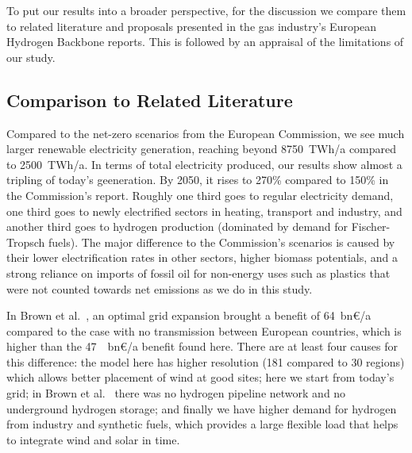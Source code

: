 To put our results into a broader perspective, for the discussion we compare
them to related literature and proposals presented in the gas industry's
European Hydrogen Backbone reports. This is followed by an appraisal of the
limitations of our study.

\subsection*{Comparison to Related Literature}

Compared to the net-zero scenarios from the European
Commission\cite{in-depth_2018}, we see much larger renewable electricity
generation, reaching beyond 8750~TWh/a compared to 2500~TWh/a.\cite{in-depth_2018} In terms of total electricity produced, our results show
almost a tripling of today's geeneration. By 2050, it rises to 270\% compared to 150\%
in the Commission's report.\cite{in-depth_2018} Roughly one third goes to regular
electricity demand, one third goes to newly electrified sectors in heating,
transport and industry, and another third goes to hydrogen production (dominated by
demand for Fischer-Tropsch fuels). The major difference to the Commission's
scenarios\cite{in-depth_2018} is caused by their lower electrification rates in
other sectors, higher biomass potentials, and a strong reliance on imports of
fossil oil for non-energy uses such as plastics that were not counted towards
net emissions as we do in this study.

In Brown et al.~\cite{brownSynergiesSector2018}, an optimal grid expansion
brought a benefit of 64~bn\euro/a compared to the case with no
transmission between European countries, which is higher than the
47~~bn\euro/a benefit found here. There are at least four causes for
this difference: the model here has higher resolution (181 compared to 30
regions) which allows better placement of wind at good sites; here we start from
today's grid; in Brown et al.~\cite{brownSynergiesSector2018} there was no
hydrogen pipeline network and no underground hydrogen storage; and finally we
have higher demand for hydrogen from industry and synthetic fuels, which
provides a large flexible load that helps to integrate wind and solar in time.


